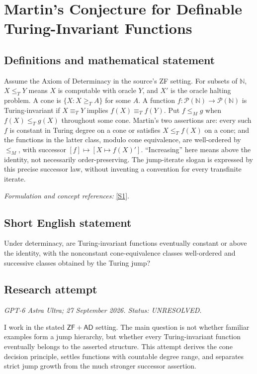 \documentclass[11pt]{article}
\begin{document}
\section*{\texorpdfstring{Martin's Conjecture for Definable Turing-Invariant Functions}{Martin's Conjecture for Definable Turing-Invariant Functions}}\label{415}
\subsection{Definitions and mathematical statement}
Assume the Axiom of Determinacy in the source's ZF setting. For subsets of ${\mathbb{N}}$, $X\le_TY$ means $X$ is computable with oracle $Y$, and $X'$ is the oracle halting problem. A cone is $\{X:X\ge_TA\}$ for some $A$. A function $f:\mathcal P({\mathbb{N}})\to\mathcal P({\mathbb{N}})$ is Turing-invariant if $X\equiv_TY$ implies $f(X)\equiv_Tf(Y)$. Put $f\le_Mg$ when $f(X)\le_Tg(X)$ throughout some cone. Martin's two assertions are: every such $f$ is constant in Turing degree on a cone or satisfies $X\le_Tf(X)$ on a cone; and the functions in the latter class, modulo cone equivalence, are well-ordered by $\le_M$, with successor $[f]\mapsto[X\mapsto f(X)']$. ``Increasing'' here means above the identity, not necessarily order-preserving. The jump-iterate slogan is expressed by this precise successor law, without inventing a convention for every transfinite iterate.
\par\smallskip\textit{Formulation and concept references:} \href{https://arxiv.org/html/2510.19147}{[S1]}.

\subsection{Short English statement}
Under determinacy, are Turing-invariant functions eventually constant or above the identity, with the nonconstant cone-equivalence classes well-ordered and successive classes obtained by the Turing jump?
\subsection{Research attempt}
\textit{GPT-6 Astra Ultra; 27 September 2026. Status: UNRESOLVED.}

I work in the stated $\mathsf{ZF}+\mathsf{AD}$ setting. The main
question is not whether familiar examples form a jump hierarchy, but
whether every Turing-invariant function eventually belongs to the
asserted structure. This attempt derives the cone decision principle,
settles functions with countable degree range, and separates strict
jump growth from the much stronger successor assertion.
\end{document}
